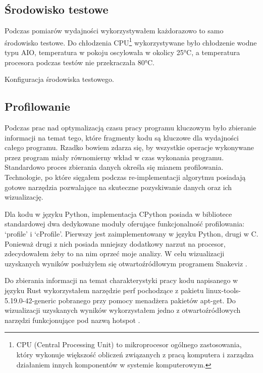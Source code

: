 \documentclass[11pt, a4paper]{article}
\begin{document}
\begin{sloppypar}
    \subsection{Środowisko testowe}
    Podczas pomiarów wydajności wykorzystywałem każdorazowo to samo środowisko testowe.
    Do chłodzenia CPU\footnote{CPU (Central Processing Unit) to mikroprocesor ogólnego zastosowania,
    który wykonuje większość obliczeń związanych z pracą komputera i zarządza działaniem
    innych komponentów w systemie komputerowym.} wykorzystywane było chłodzenie wodne
    typu AIO, temperatura w pokoju oscylowała w okolicy 25°C, a temperatura procesora
    podczas testów nie przekraczała 80°C.

    \begin{table}[ht]
      \centering
      
      \caption{Konfiguracja środowiska testowego.}
      \label{pc-configuration}
    \end{table}

    \subsection{Profilowanie}
    Podczas prac nad optymalizacją czasu pracy programu kluczowym było zbieranie informacji
    na temat tego, które fragmenty kodu są kluczowe dla wydajności całego programu. Rzadko
    bowiem zdarza się, by wszystkie operacje wykonywane przez program miały równomierny
    wkład w czas wykonania programu. Standardowo proces zbierania danych określa się mianem
    profilowania. Technologie, po które sięgałem podczas re-implementacji algorytmu posiadają
    gotowe narzędzia pozwalające na skuteczne pozyskiwanie danych oraz ich wizualizację.

    Dla kodu w języku Python, implementacja CPython posiada w bibliotece standardowej
    dwa dedykowane moduły oferujące funkcjonalność profilowania: `profile' i `cProfile'.
    Pierwszy jest zaimplementowany w języku Python, drugi w C. Ponieważ drugi z nich
    posiada mniejszy dodatkowy narzut na procesor, zdecydowałem żeby to na nim oprzeć moje
    analizy. W celu wizualizacji uzyskanych wyników posłużyłem się otwartoźródłowym
    programem Snakeviz \cite{Snakeviz_PyPI}.

    Do zbierania informacji na temat charakterystyki pracy kodu napisanego w języku Rust
    wykorzystałem narzędzie perf pochodzące z pakietu linux-tools-5.19.0-42-generic pobranego
    przy pomocy menadżera pakietów apt-get. Do wizualizacji uzyskanych wyników
    wykorzystałem jedno z otwartoźródłowych narzędzi funkcjonujące pod nazwą hotspot
    \cite{HOTSPOT}.


\end{sloppypar}
\end{document}
